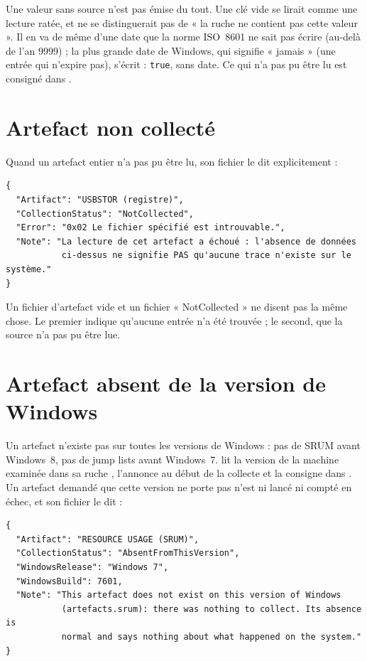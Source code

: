 \documentclass[11pt,a4paper,oneside]{report}
\begin{document}
Une valeur sans source n'est pas émise du tout. Une clé vide se lirait comme une
lecture ratée, et ne se distinguerait pas de « la ruche ne contient pas cette
valeur ». Il en va de même d'une date que la norme ISO~8601 ne sait pas écrire
(au-delà de l'an 9999) ; la plus grande date de Windows, qui signifie
« jamais » (une entrée qui n'expire pas), s'écrit  :
\texttt{true}, sans date. Ce qui n'a pas pu être lu est consigné dans
.

\section{Artefact non collecté}

Quand un artefact entier n'a pas pu être lu, son fichier le dit explicitement :

\begin{lstlisting}
{
  "Artifact": "USBSTOR (registre)",
  "CollectionStatus": "NotCollected",
  "Error": "0x02 Le fichier spécifié est introuvable.",
  "Note": "La lecture de cet artefact a échoué : l'absence de données
           ci-dessus ne signifie PAS qu'aucune trace n'existe sur le système."
}
\end{lstlisting}

\begin{attention}
Un fichier d'artefact vide et un fichier « NotCollected » ne disent pas la même
chose. Le premier indique qu'aucune entrée n'a été trouvée ; le second, que
la source n'a pas pu être lue.
\end{attention}

\section{Artefact absent de la version de Windows}\label{sec:versions}

Un artefact n'existe pas sur toutes les versions de Windows : pas de SRUM avant
Windows~8, pas de jump lists avant Windows~7. \wac{} lit la version de la machine
examinée dans sa ruche , l'annonce au début de la collecte et
la consigne dans . Un artefact demandé que cette
version ne porte pas n'est ni lancé ni compté en échec, et son fichier le dit :

\begin{lstlisting}
{
  "Artifact": "RESOURCE USAGE (SRUM)",
  "CollectionStatus": "AbsentFromThisVersion",
  "WindowsRelease": "Windows 7",
  "WindowsBuild": 7601,
  "Note": "This artefact does not exist on this version of Windows
           (artefacts.srum): there was nothing to collect. Its absence is
           normal and says nothing about what happened on the system."
}
\end{lstlisting}
\end{document}
